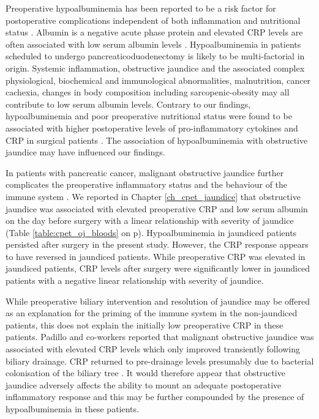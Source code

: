 Preoperative hypoalbuminemia has been reported to be a risk factor for postoperative complications independent of both inflammation and nutritional status \parencite{gibbs_preoperative_1999, don_poor_2004, hennessey_preoperative_2010}.
Albumin is a negative acute phase protein and elevated CRP levels are often associated with low serum albumin levels \parencite{margarson_serum_1998}. 
Hypoalbuminemia in patients scheduled to undergo pancreaticoduodenectomy is likely to be multi-factorial in origin. 
Systemic inflammation, obstructive jaundice and the associated complex physiological, biochemical and immunological abnormalities, malnutrition, cancer cachexia, changes in body composition including sarcopenic-obesity may all contribute to low serum albumin levels. 
Contrary to our findings, hypoalbuminemia and poor preoperative nutritional status were found to be associated with higher postoperative levels of pro-inflammatory cytokines and CRP in surgical patients \parencite{nakamura_influence_1999}.
The association of hypoalbuminemia with obstructive jaundice may have influenced our findings. 

In patients with pancreatic cancer, malignant obstructive jaundice further complicates the preoperative inflammatory status and the behaviour of the immune system \parencite{nehez_compromise_2002}. 
We reported in Chapter \ref{ch_cpet_jaundice} that obstructive jaundice was associated with elevated preoperative CRP and low serum albumin on the day before surgery with a linear relationship with severity of jaundice (Table \ref{table:cpet_oj_bloods} on p\pageref{table:cpet_oj_bloods}).
Hypoalbuminemia in jaundiced patients persisted after surgery in the present study.
However, the CRP response appears to have reversed in jaundiced patients.
While preoperative CRP was elevated in jaundiced patients, CRP levels after surgery were significantly lower in jaundiced patients with a negative linear relationship with severity of jaundice.

While preoperative biliary intervention and resolution of jaundice may be offered as an explanation for the priming of the immune system in the non-jaundiced patients, this does not explain the initially low preoperative CRP in these patients.
Padillo and co-workers reported that malignant obstructive jaundice was associated with elevated CRP levels which only improved transiently following biliary drainage.
CRP returned to pre-drainage levels presumably due to bacterial colonisation of the biliary tree  \parencite{padillo_effect_2002, padillo_cytokines_2001}.
It would therefore appear that obstructive jaundice adversely affects the ability to mount an adequate postoperative inflammatory response and this may be further compounded by the presence of hypoalbuminemia in these patients.

